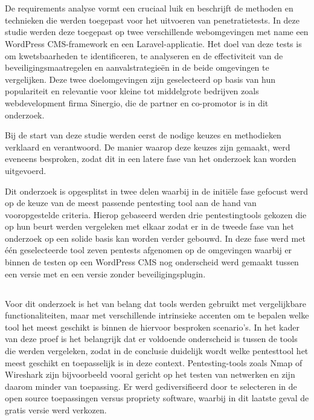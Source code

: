 \section{}
De requirements analyse vormt een cruciaal luik en beschrijft de methoden en technieken die werden toegepast 
voor het uitvoeren van penetratietests. In deze studie werden deze toegepast op twee 
verschillende webomgevingen met name een WordPress CMS-framework en een Laravel-applicatie. Het doel van deze tests is om kwetsbaarheden te identificeren, te 
analyseren en de effectiviteit van de beveiligingsmaatregelen en aanvalstrategieën in de beide omgevingen te vergelijken.
Deze twee doelomgevingen zijn geselecteerd op basis van hun populariteit en relevantie voor kleine tot middelgrote bedrijven 
zoals webdevelopment firma Sinergio, die de partner en co-promotor is in dit onderzoek.

Bij de start van deze studie werden eerst de nodige keuzes en methodieken verklaard en verantwoord. De manier waarop deze keuzes zijn gemaakt, werd eveneens 
besproken, zodat dit in een latere fase van het onderzoek kan worden uitgevoerd.

Dit onderzoek is opgesplitst in twee delen waarbij in de initiële fase gefocust werd op de keuze van de meest passende pentesting tool 
aan de hand van vooropgestelde criteria. Hierop gebaseerd werden drie pentestingtools gekozen die op hun beurt werden vergeleken met elkaar 
zodat er in de tweede fase van het onderzoek op een solide basis kan worden verder gebouwd. In deze fase werd met één geselecteerde 
tool zeven pentests afgenomen op de omgevingen waarbij er binnen de testen op een WordPress CMS nog onderscheid werd gemaakt 
tussen een versie met en een versie zonder beveiligingsplugin.

\subsection{}
Voor dit onderzoek is het van 
belang dat tools werden gebruikt met vergelijkbare functionaliteiten, maar met verschillende intrinsieke accenten om te bepalen welke 
tool het meest geschikt is binnen de hiervoor besproken scenario's. In het kader van deze proef is het belangrijk dat er voldoende onderscheid is tussen de tools 
die werden vergeleken, zodat in de conclusie duidelijk wordt welke pentesttool het meest geschikt en toepasselijk is in deze context. 
Pentesting-tools zoals Nmap of Wireshark zijn bijvoorbeeld vooral gericht op het testen van netwerken en  zijn daarom minder van toepassing. Er werd 
gediversifieerd door te selecteren in de open source toepassingen versus propriety software, waarbij in dit laatste geval de gratis versie werd 
verkozen. 

